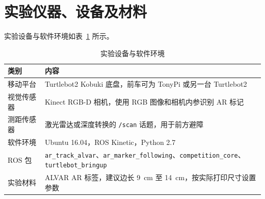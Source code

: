 \section{实验仪器、设备及材料}
实验设备与软件环境如表~\ref{tab:devices} 所示。

\begin{table}[H]
	\centering
	\caption{实验设备与软件环境}
	\label{tab:devices}
	\begin{tabular}{ll}
		\toprule
		类别 & 内容 \\
		\midrule
		移动平台 & Turtlebot2 Kobuki 底盘，前车可为 TonyPi 或另一台 Turtlebot2 \\
		视觉传感器 & Kinect RGB-D 相机，使用 RGB 图像和相机内参识别 AR 标记 \\
		测距传感器 & 激光雷达或深度转换的 \texttt{/scan} 话题，用于前方避障 \\
		软件环境 & Ubuntu 16.04，ROS Kinetic，Python 2.7 \\
		ROS 包 & \texttt{ar\_track\_alvar}、\texttt{ar\_marker\_following}、\texttt{competition\_core}、\texttt{turtlebot\_bringup} \\
		实验材料 & ALVAR AR 标签，建议边长 \SI{9}{cm} 至 \SI{14}{cm}，按实际打印尺寸设置参数 \\
		\bottomrule
	\end{tabular}
\end{table}
